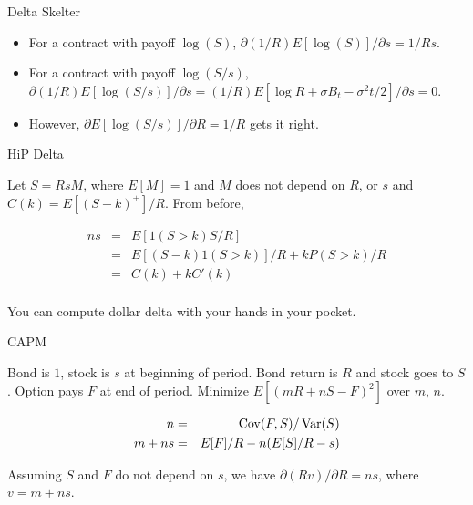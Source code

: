 \documentclass[pdf,colorBG,slideColor,blends]{prosper}
\def\Var{\mathop{\rm Var}}
\def\Cov{\mathop{\rm Cov}}
\begin{document}
\begin{slide}{Delta Skelter}

\begin{itemize}

\item
For a contract with payoff $\log(S)$,
$\partial (1/R) E[\log(S)]/\partial s = 1/Rs$.

\item
For a contract with payoff $\log(S/s)$,
$\partial (1/R) E[\log(S/s)]/\partial s
= (1/R) E[\log R + \sigma B_t - \sigma^2t/2]/\partial s = 0$.

\item However, $\partial E[\log(S/s)]/\partial R = 1/R$ gets it right.

\end{itemize}

\end{slide}

\begin{slide}{HiP Delta}

Let $S = RsM$, where $E[M] = 1$ and $M$ does not depend on
$R$, or $s$ and $C(k) = E[(S  - k)^+]/R$. From before,

\begin{eqnarray*}
ns &=& E[1(S > k) S/R]\\
	&=& E[(S - k)1(S > k)]/R + k P(S > k)/R\\
	&=& C(k) + k C'(k)\\
\end{eqnarray*}

You can compute dollar delta with your hands in your pocket. 

\end{slide}

\begin{slide}{CAPM}

Bond is $1$, stock is $s$ at beginning of period. Bond return
is $R$ and stock goes to $S$. Option pays $F$ at end of period.
Minimize $E[(mR + nS - F)^2]$ over $m$, $n$.

\begin{eqnarray*}
n &=& \Cov(F,S)/\Var(S)\\
m + ns &=& E[F]/R - n (E[S]/R - s)\\
\end{eqnarray*}

Assuming $S$ and $F$ do not depend on $s$, we have
$\partial(Rv)/\partial R = ns$, where $v = m + ns$.

\end{slide}
\end{document}

